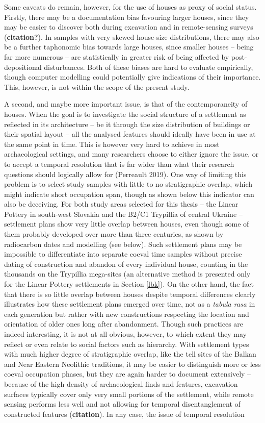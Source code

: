 \documentclass[
  12pt,
]{book}
\begin{document}
Some caveats do remain, however, for the use of houses as proxy of social status. Firstly, there may be a documentation bias favouring larger houses, since they may be easier to discover both during excavation and in remote-sensing surveys (\textbf{citation?}). In samples with very skewed house-size distributions, there may also be a further taphonomic bias towards large houses, since smaller houses -- being far more numerous -- are statistically in greater risk of being affected by post-depositional disturbances. Both of these biases are hard to evaluate empirically, though computer modelling could potentially give indications of their importance. This, however, is not within the scope of the present study.

A second, and maybe more important issue, is that of the contemporaneity of houses. When the goal is to investigate the social structure of a settlement as reflected in its architecture -- be it through the size distribution of buildings or their spatial layout -- all the analysed features should ideally have been in use at the same point in time. This is however very hard to achieve in most archaeological settings, and many researchers choose to either ignore the issue, or to accept a temporal resolution that is far wider than what their research questions should logically allow for (Perreault 2019). One way of limiting this problem is to select study samples with little to no stratigraphic overlap, which might indicate short occupation span, though as shown below this indicator can also be deceiving. For both study areas selected for this thesis -- the Linear Pottery in south-west Slovakia and the B2/C1 Trypillia of central Ukraine -- settlement plans show very little overlap between houses, even though some of them probably developed over more than three centuries, as shown by radiocarbon dates and modelling (see below). Such settlement plans may be impossible to differentiate into separate coeval time samples without precise dating of construction and abandon of every individual house, counting in the thousands on the Trypillia mega-sites (an alternative method is presented only for the Linear Pottery settlements in Section \ref{lbk}). On the other hand, the fact that there is so little overlap between houses despite temporal differences clearly illustrates how these settlement plans emerged over time, not as a \emph{tabula rasa} in each generation but rather with new constructions respecting the location and orientation of older ones long after abandonment. Though such practices are indeed interesting, it is not at all obvious, however, to which extent they may reflect or even relate to social factors such as hierarchy. With settlement types with much higher degree of stratigraphic overlap, like the tell sites of the Balkan and Near Eastern Neolithic traditions, it may be easier to distinguish more or less coeval occupation phases, but they are again harder to document extensively -- because of the high density of archaeological finds and features, excavation surfaces typically cover only very small portions of the settlement, while remote sensing performs less well and not allowing for temporal disentanglement of constructed features (\textbf{citation}). In any case, the issue of temporal resolution 
\end{document}
